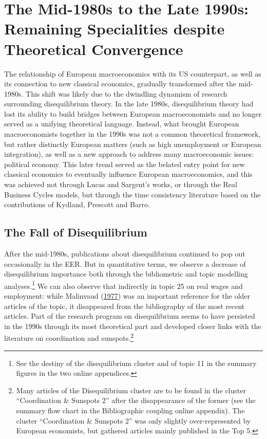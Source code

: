 \documentclass[
  12pt,
  onecolumn]{article}
\begin{document}
\hypertarget{period2}{%
\section{The Mid-1980s to the Late 1990s: Remaining Specialities despite
Theoretical Convergence}\label{period2}}

The relationship of European macroeconomics with its US counterpart, as
well as its connection to new classical economics, gradually transformed
after the mid-1980s. This shift was likely due to the dwindling dynamism
of research surrounding disequilibrium theory. In the late 1980s,
disequilibrium theory had lost its ability to build bridges between
European macroeconomists and no longer served as a unifying theoretical
language. Instead, what brought European macroeconomists together in the
1990s was not a common theoretical framework, but rather distinctly
European matters (such as high unemployment or European integration), as
well as a new approach to address many macroeconomic issues: political
economy. This later trend served as the belated entry point for new
classical economics to eventually influence European macroeconomics, and
this was achieved not through Lucas and Sargent's works, or through the
Real Business Cycles models, but through the time consistency literature
based on the contributions of Kydland, Prescott and Barro.

\hypertarget{disequilibrium-fall}{%
\subsection{The Fall of Disequilibrium}\label{disequilibrium-fall}}

After the mid-1980s, publications about disequilibrium continued to pop
out occasionally in the EER. But in quantitative terms, we observe a
decrease of disequilibrium importance both through the bibliometric and
topic modelling analyses.\footnote{See the destiny of the disequilibrium
  cluster and of topic 11 in the summary figures in the two online
  appendices.} We can also observe that indirectly in topic 25 on real
wages and employment: while Malinvaud
(\protect\hyperlink{ref-malinvaud1977}{1977}) was an important reference
for the older articles of the topic, it disappeared from the
bibliography of the most recent articles. Part of the research program
on disequilibrium seems to have persisted in the 1990s through its most
theoretical part and developed closer links with the literature on
coordination and sunspots.\footnote{Many articles of the Disequilibrium
  cluster are to be found in the cluster ``Coordination \& Sunspots 2''
  after the disappearance of the former (see the summary flow chart in
  the Bibliographic coupling online appendix). The cluster
  ``Coordination \& Sunspots 2'' was only slightly over-represented by
  European economists, but gathered articles mainly published in the Top
  5.}
\end{document}
